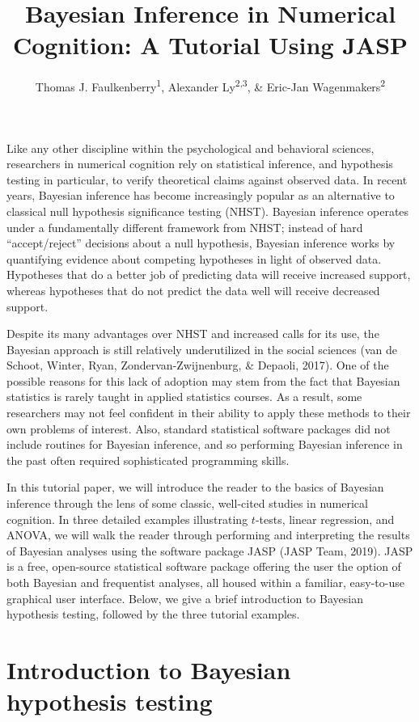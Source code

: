 \documentclass[english,,doc,floatsintext]{apa6}
\title{Bayesian Inference in Numerical Cognition: A Tutorial Using JASP}
\author{Thomas J. Faulkenberry\textsuperscript{1}, Alexander Ly\textsuperscript{2,3}, \& Eric-Jan Wagenmakers\textsuperscript{2}}
\date{}
\affiliation{
\vspace{0.5cm}
\textsuperscript{1} Tarleton State University\\\textsuperscript{2} University of Amsterdam\\\textsuperscript{3} Centrum Wiskunde \& Informatica}
\begin{document}
\maketitle

Like any other discipline within the psychological and behavioral sciences, researchers in numerical cognition rely on statistical inference, and hypothesis testing in particular, to verify theoretical claims against observed data. In recent years, Bayesian inference has become increasingly popular as an alternative to classical null hypothesis significance testing (NHST). Bayesian inference operates under a fundamentally different framework from NHST; instead of hard \enquote{accept/reject} decisions about a null hypothesis, Bayesian inference works by quantifying evidence about competing hypotheses in light of observed data. Hypotheses that do a better job of predicting data will receive increased support, whereas hypotheses that do not predict the data well will receive decreased support.

Despite its many advantages over NHST and increased calls for its use, the Bayesian approach is still relatively underutilized in the social sciences (van de Schoot, Winter, Ryan, Zondervan-Zwijnenburg, \& Depaoli, 2017). One of the possible reasons for this lack of adoption may stem from the fact that Bayesian statistics is rarely taught in applied statistics courses. As a result, some researchers may not feel confident in their ability to apply these methods to their own problems of interest. Also, standard statistical software packages did not include routines for Bayesian inference, and so performing Bayesian inference in the past often required sophisticated programming skills.

In this tutorial paper, we will introduce the reader to the basics of Bayesian inference through the lens of some classic, well-cited studies in numerical cognition. In three detailed examples illustrating \(t\)-tests, linear regression, and ANOVA, we will walk the reader through performing and interpreting the results of Bayesian analyses using the software package JASP (JASP Team, 2019). JASP is a free, open-source statistical software package offering the user the option of both Bayesian and frequentist analyses, all housed within a familiar, easy-to-use graphical user interface. Below, we give a brief introduction to Bayesian hypothesis testing, followed by the three tutorial examples.

\hypertarget{introduction-to-bayesian-hypothesis-testing}{%
\section{Introduction to Bayesian hypothesis testing}\label{introduction-to-bayesian-hypothesis-testing}}
\end{document}
